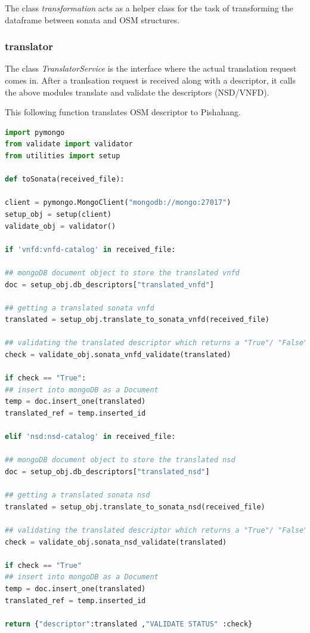 The class \textit{transformation} acts as a helper class for the task of transforming the dataframe between sonata and OSM structures. 

\subsubsection{translator}

The class \textit{TranslatorService} is the interface where the actual translation request comes in. After a tranlsation request is received along with a descriptor, it calls the above modules translate and validate the descriptors (NSD/VNFD).

This following function translates OSM descriptor to Pishahang.
\begin{lstlisting}[language=Python,caption= Translating OSM descriptor to Pishahang, label=lis:toSOnata]
import pymongo
from validate import validator
from utilities import setup

def toSonata(received_file):

client = pymongo.MongoClient("mongodb://mongo:27017")
setup_obj = setup(client)
validate_obj = validator()

if 'vnfd:vnfd-catalog' in received_file:

## mongoDB document object to store the translated vnfd
doc = setup_obj.db_descriptors["translated_vnfd"]

## getting a translated sonata vnfd
translated = setup_obj.translate_to_sonata_vnfd(received_file)

## validating the translated descriptor which returns a "True"/ "False" string
check = validate_obj.sonata_vnfd_validate(translated)

if check == "True":
## insert into mongoDB as a Document
temp = doc.insert_one(translated)
translated_ref = temp.inserted_id

elif 'nsd:nsd-catalog' in received_file:

## mongoDB document object to store the translated nsd
doc = setup_obj.db_descriptors["translated_nsd"]

## getting a translated sonata nsd
translated = setup_obj.translate_to_sonata_nsd(received_file)

## validating the translated descriptor which returns a "True"/ "False" string
check = validate_obj.sonata_nsd_validate(translated)

if check == "True"
## insert into mongoDB as a Document
temp = doc.insert_one(translated)
translated_ref = temp.inserted_id

return {"descriptor":translated ,"VALIDATE STATUS" :check}
\end{lstlisting}

